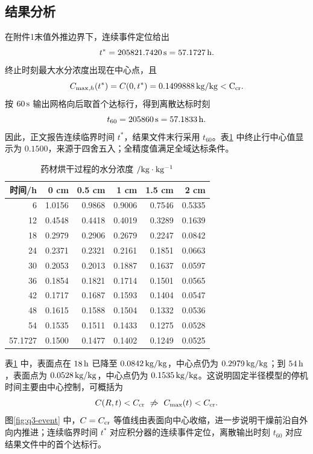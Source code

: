 \documentclass[UTF8,a4paper,12pt]{ctexart}
\begin{document}
\subsection{结果分析}
在附件1末值外推边界下，连续事件定位给出
\begin{equation}
  t^*=205821.7420\rm\,s=57.1727\rm\,h.
\end{equation}
终止时刻最大水分浓度出现在中心点，且
\begin{equation}
  C_{\max,h}(t^*)=C(0,t^*)=0.1499888\rm\,kg/kg<C_{\rm cr}.
\end{equation}
按 $60\rm\,s$ 输出网格向后取首个达标行，得到离散达标时刻
\begin{equation}
  t_{60}=205860\rm\,s=57.1833\rm\,h.
\end{equation}
因此，正文报告连续临界时间 $t^*$，结果文件末行采用 $t_{60}$。表\ref{tab:q3-moist} 中终止行中心值显示为 $0.1500$，来源于四舍五入；全精度值满足全域达标条件。

\begin{table}[H]
  \centering
  \caption{药材烘干过程的水分浓度 $/\rm kg\cdot kg^{-1}$}
  \label{tab:q3-moist}
  \begin{tabular}{rrrrrr}
    \toprule
    时间/h & 0 cm & 0.5 cm & 1 cm & 1.5 cm & 2 cm\\ \midrule
    6 & 1.0156 & 0.9868 & 0.9006 & 0.7546 & 0.5335\\
    12 & 0.4548 & 0.4418 & 0.4019 & 0.3289 & 0.1639\\
    18 & 0.2979 & 0.2906 & 0.2679 & 0.2247 & 0.0842\\
    24 & 0.2371 & 0.2321 & 0.2161 & 0.1851 & 0.0663\\
    30 & 0.2053 & 0.2013 & 0.1887 & 0.1637 & 0.0597\\
    36 & 0.1854 & 0.1821 & 0.1714 & 0.1501 & 0.0565\\
    42 & 0.1717 & 0.1687 & 0.1593 & 0.1404 & 0.0547\\
    48 & 0.1615 & 0.1588 & 0.1504 & 0.1332 & 0.0536\\
    54 & 0.1535 & 0.1511 & 0.1433 & 0.1275 & 0.0528\\
    57.1727 & 0.1500 & 0.1477 & 0.1402 & 0.1249 & 0.0525\\
    \bottomrule
  \end{tabular}
\end{table}

表\ref{tab:q3-moist} 中，表面点在 $18\rm\,h$ 已降至 $0.0842\rm\,kg/kg$，中心点仍为 $0.2979\rm\,kg/kg$；到 $54\rm\,h$，表面点为 $0.0528\rm\,kg/kg$，中心点仍为 $0.1535\rm\,kg/kg$。这说明固定半径模型的停机时间主要由中心控制，可概括为
\begin{equation}
  C(R,t)<C_{\rm cr}\ \not\Rightarrow\ C_{\max}(t)<C_{\rm cr}.
\end{equation}
图\ref{fig:q3-event} 中，$C=C_{\rm cr}$ 等值线由表面向中心收缩，进一步说明干燥前沿自外向内推进；连续临界时间 $t^*$ 对应积分器的连续事件定位，离散输出时刻 $t_{60}$ 对应结果文件中的首个达标行。
\end{document}
